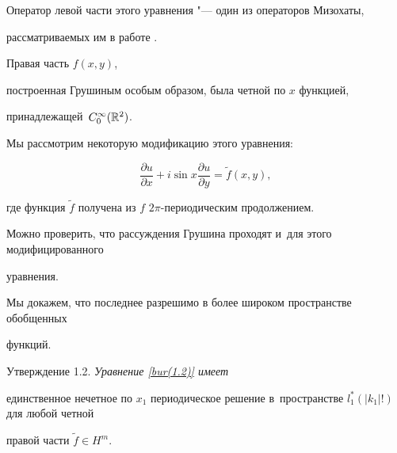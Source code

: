 Оператор левой части этого уравнения "--- один из операторов Мизохаты,

рассматриваемых им в работе \cite{bur:10}. 

Правая часть $f (x, y)$,

построенная Грушиным особым образом, была четной по $x$ функцией,

принадлежащей~$C_0^\infty ({\Bbb R}^2)$.



Мы рассмотрим некоторую модификацию этого уравнения:

\begin{equation}

\frac {\partial u}{\partial x} + i \sin x \frac {\partial u}{\partial y} =

\tilde f (x, y),

\label{bur(1.2)}

\end{equation}

где функция $\tilde f$ получена из $f$  $ 2 \pi$-периодическим продолжением.

Можно проверить, что рассуждения Грушина проходят и~для этого модифицированного

уравнения.

Мы докажем, что последнее разрешимо в более широком пространстве обобщенных

функций.



\smallskip

{\small\sc Утверждение  1.2.} \it Уравнение \eqref{bur(1.2)} имеет

единственное нечетное по $x_1$ периодическое решение в~пространстве $l_1^* (|k_1| !)$ для любой четной

правой части $\tilde f \in H^m.$ \rm



\smallskip



\medskip

